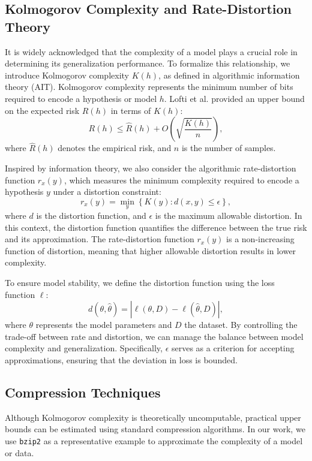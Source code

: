 \documentclass{article}
\begin{document}
\subsection{Kolmogorov Complexity and Rate-Distortion Theory}

It is widely acknowledged that the complexity of a model plays a crucial role in determining its generalization performance. To formalize this relationship, we introduce Kolmogorov complexity $K(h)$, as defined in algorithmic information theory (AIT). Kolmogorov complexity represents the minimum number of bits required to encode a hypothesis or model $h$. Lofti et al. provided an upper bound on the expected risk $R(h)$ in terms of $K(h)$:
$$
R(h) \leq \hat{R}(h) + O\left(\sqrt{\frac{K(h)}{n}}\right),
$$
where $\hat{R}(h)$ denotes the empirical risk, and $n$ is the number of samples.

Inspired by information theory, we also consider the algorithmic rate-distortion function $r_x(y)$, which measures the minimum complexity required to encode a hypothesis $y$ under a distortion constraint:
$$
r_x(y) = \min_y\left\{ K(y): d(x, y) \leq \epsilon \right\},
$$
where $d$ is the distortion function, and $\epsilon$ is the maximum allowable distortion. In this context, the distortion function quantifies the difference between the true risk and its approximation. The rate-distortion function $r_x(y)$ is a non-increasing function of distortion, meaning that higher allowable distortion results in lower complexity.

To ensure model stability, we define the distortion function using the loss function $\ell$:
$$
d(\theta, \hat{\theta}) = \left| \ell(\theta, D) - \ell(\hat{\theta}, D) \right|,
$$
where $\theta$ represents the model parameters and $D$ the dataset. By controlling the trade-off between rate and distortion, we can manage the balance between model complexity and generalization. Specifically, $\epsilon$ serves as a criterion for accepting approximations, ensuring that the deviation in loss is bounded.

\subsection{Compression Techniques}

Although Kolmogorov complexity is theoretically uncomputable, practical upper bounds can be estimated using standard compression algorithms. In our work, we use \texttt{bzip2} as a representative example to approximate the complexity of a model or data.
\end{document}
